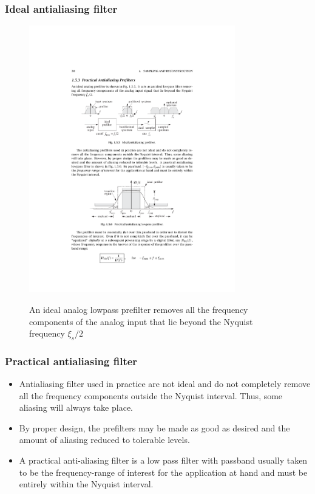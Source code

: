 \begin{frame}
\frametitle{Ideal antialiasing filter}

\begin{figure}
  \centering
  \includegraphics[width=0.8\textwidth]{IdelaAntiAlias}\\
  \caption{An ideal analog lowpass prefilter removes all the frequency components of the analog input that lie beyond the Nyquist frequency $\xi_s/2$}
\end{figure}


\end{frame}

\begin{frame}
\frametitle{Practical antialiasing filter}
\begin{itemize}
\item Antialiasing filter used in practice are not ideal and do not completely remove all the frequency components outside the Nyquist interval. Thus, some \alert{aliasing will always take place}.
\item By proper design, the prefilters may be made as good as desired and the amount of aliasing reduced to tolerable levels.
\item A practical anti-aliasing filter is a low pass filter with passband usually taken to be the \alert{frequency-range of interest} for the application at hand and \alert{must be entirely within the Nyquist interval}.
\end{itemize}
\end{frame}


